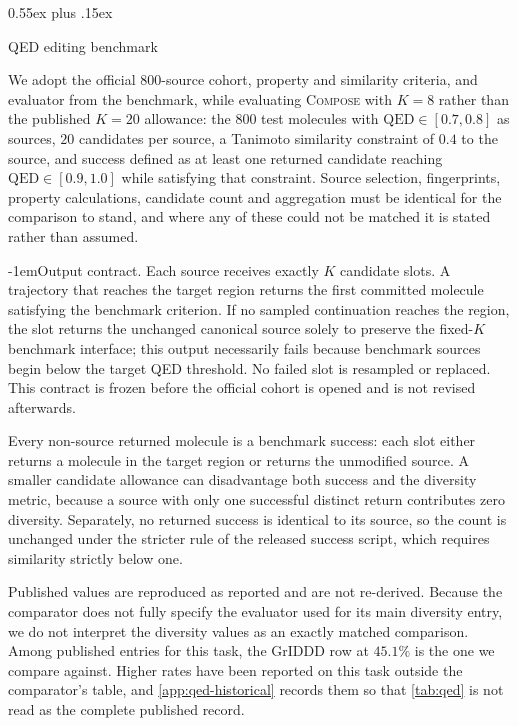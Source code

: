 \documentclass{article}
\makeatletter
\theoremstyle{definition}
\theoremstyle{remark}
\newcommand{\method}{\textsc{Compose}\xspace}
\def\subsection{\@startsection{subsection}{2}{\z@}{-1.2ex plus -0.4ex minus -.2ex}%
  {0.55ex plus .15ex}{\normalsize\sc\raggedright}}
\def\paragraph{\@startsection{paragraph}{4}{\z@}{1.0ex plus 0.3ex minus .2ex}%
  {-1em}{\normalsize\bf}}
\makeatother
\begin{document}
\subsection{{QED} editing benchmark}
\label{app:bench-qed}

We adopt the official $800$-source cohort, property and similarity criteria, and evaluator from the benchmark, while evaluating \method{} with $K=8$ rather than the published $K=20$ allowance: the $800$ test molecules with $\mathrm{QED}\in[0.7,0.8]$ as sources, $20$ candidates per source, a Tanimoto similarity constraint of $0.4$ to the source, and success defined as at least one returned candidate reaching $\mathrm{QED}\in[0.9,1.0]$ while satisfying that constraint. Source selection, fingerprints, property calculations, candidate count and aggregation must be identical for the comparison to stand, and where any of these could not be matched it is stated rather than assumed.

\paragraph{Output contract.} Each source receives exactly $K$ candidate slots. A trajectory that reaches the target region returns the first committed molecule satisfying the benchmark criterion. If no sampled continuation reaches the region, the slot returns the unchanged canonical source solely to preserve the fixed-$K$ benchmark interface; this output necessarily fails because benchmark sources begin below the target QED threshold. No failed slot is resampled or replaced. This contract is frozen before the official cohort is opened and is not revised afterwards.

Every non-source returned molecule is a benchmark success: each slot either returns a molecule in the target region or returns the unmodified source. A smaller candidate allowance can disadvantage both success and the diversity metric, because a source with only one successful distinct return contributes zero diversity. Separately, no returned success is identical to its source, so the count is unchanged under the stricter rule of the released success script, which requires similarity strictly below one.

Published values are reproduced as reported and are not re-derived. Because the comparator does not fully specify the evaluator used for its main diversity entry, we do not interpret the diversity values as an exactly matched comparison. Among published entries for this task, the GrIDDD row at $45.1\%$ is the one we compare against. Higher rates have been reported on this task outside the comparator's table, and \cref{app:qed-historical} records them so that \cref{tab:qed} is not read as the complete published record.
\end{document}
